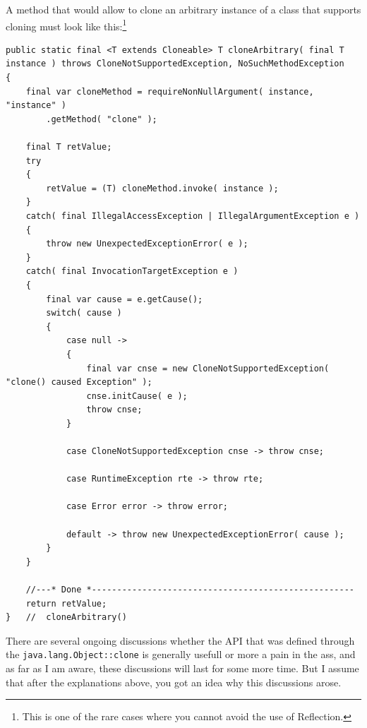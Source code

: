 \documentclass[11pt,a4paper, titlepage, parskip=half, headsepline, footsepline, cleardoublepage=current, headheight=1cm]{scrbook}
\begin{document}
A method that would allow to clone an arbitrary instance of a class that supports cloning must look like this:\footnote{This is one of the rare cases where you cannot avoid the use of Reflection.}
\begin{lstlisting}
public static final <T extends Cloneable> T cloneArbitrary( final T instance ) throws CloneNotSupportedException, NoSuchMethodException
{
    final var cloneMethod = requireNonNullArgument( instance, "instance" )
        .getMethod( "clone" );
        
    final T retValue;
    try
    {
        retValue = (T) cloneMethod.invoke( instance );
    }    
    catch( final IllegalAccessException | IllegalArgumentException e )
    {
        throw new UnexpectedExceptionError( e );
    }
    catch( final InvocationTargetException e )
    {
        final var cause = e.getCause();
        switch( cause )
        {
            case null -> 
            {
                final var cnse = new CloneNotSupportedException( "clone() caused Exception" );
                cnse.initCause( e );
                throw cnse;
            }
            
            case CloneNotSupportedException cnse -> throw cnse;
            
            case RuntimeException rte -> throw rte;
            
            case Error error -> throw error;

            default -> throw new UnexpectedExceptionError( cause );
        }
    }

    //---* Done *----------------------------------------------------
    return retValue;
}   //  cloneArbitrary()
\end{lstlisting}

There are several ongoing discussions whether the API that was defined through the \lstinline|java.lang.Object::clone| is generally usefull or more a pain in the ass, and as far as I am aware, these discussions will last for some more time. But I assume that after the explanations above, you got an idea why this discussions arose.
\end{document}
